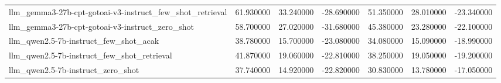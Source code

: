 \begin{tabular}{lrrrrrr}
llm\_gemma3-27b-cpt-gotoai-v3-instruct\_few\_shot\_retrieval & 61.930000 & 33.240000 & -28.690000 & 51.350000 & 28.010000 & -23.340000 \\
llm\_gemma3-27b-cpt-gotoai-v3-instruct\_zero\_shot & 58.700000 & 27.020000 & -31.680000 & 45.380000 & 23.280000 & -22.100000 \\
llm\_qwen2.5-7b-instruct\_few\_shot\_acak & 38.780000 & 15.700000 & -23.080000 & 34.080000 & 15.090000 & -18.990000 \\
llm\_qwen2.5-7b-instruct\_few\_shot\_retrieval & 41.870000 & 19.060000 & -22.810000 & 38.250000 & 19.050000 & -19.200000 \\
llm\_qwen2.5-7b-instruct\_zero\_shot & 37.740000 & 14.920000 & -22.820000 & 30.830000 & 13.780000 & -17.050000 \\
\bottomrule
\end{tabular}
